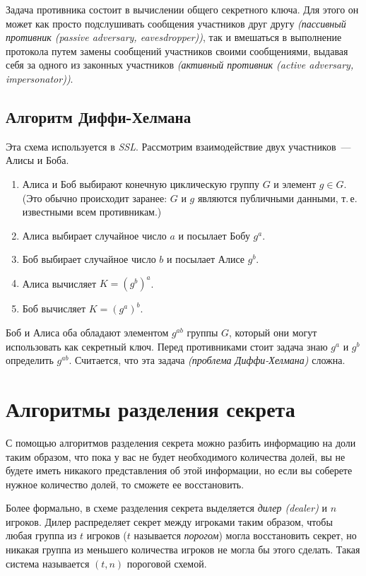 \documentclass[a4paper,10pt]{article}
\begin{document}
Задача противника состоит в вычислении общего секретного ключа. Для этого он может как просто
подслушивать сообщения участников друг другу {\it (пассивный противник (passive adversary,
eavesdropper))}, так и вмешаться в выполнение протокола путем замены сообщений участников своими
сообщениями, выдавая себя за одного из законных участников {\it (активный противник (active adversary,
impersonator))}. 

\subsection{Алгоритм Диффи-Хелмана}
Эта схема используется в {\it SSL}. Рассмотрим взаимодействие двух участников~--- Алисы и Боба.
\begin{enumerate}
    \item Алиса и Боб выбирают конечную циклическую группу $G$ и элемент $g\in G$.
        (Это обычно происходит заранее: $G$ и $g$ являются публичными данными, т.\,е. известными
        всем противникам.) 
    \item Алиса выбирает случайное число $a$ и посылает Бобу  $g^a$.
    \item Боб   выбирает случайное число $b$ и посылает Алисе $g^b$.
    \item Алиса вычисляет $K = (g^b)^a$.
    \item Боб   вычисляет $K = (g^a)^b$.
\end{enumerate}
Боб и Алиса оба обладают элементом $g^{ab}$ группы $G$, который они могут использовать как секретный
ключ. Перед противниками стоит задача знаю $g^a$ и $g^b$ определить  $g^{ab}$.
Считается, что эта задача {\it (проблема Диффи-Хелмана)} сложна.

\section{Алгоритмы разделения секрета}
С помощью алгоритмов разделения секрета можно разбить информацию на доли таким образом, что пока у
вас не будет необходимого количества долей, вы не будете иметь никакого представления об этой
информации, но если вы соберете нужное количество долей, то сможете ее восстановить.

Более формально, в схеме разделения секрета выделяется {\it дилер (dealer)} и $n$ игроков.
Дилер распределяет секрет между игроками таким образом, чтобы любая группа из $t$
игроков ($t$ называется {\it порогом}) могла восстановить секрет, но никакая группа из меньшего
количества игроков не могла бы этого сделать. Такая система называется $(t,n)$ пороговой схемой.
\end{document}
